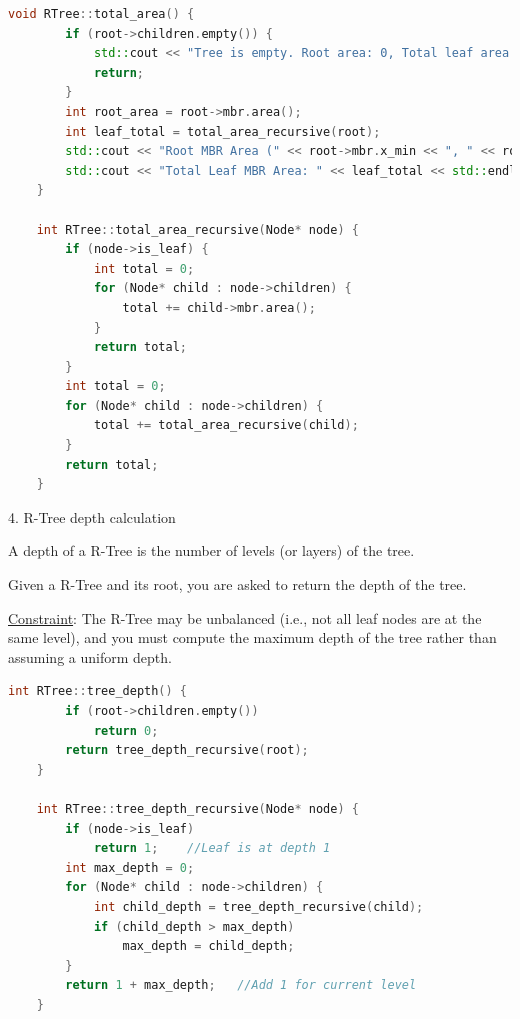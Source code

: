 \documentclass{article}
\begin{document}
\begin{lstlisting}[language=c++]
	void RTree::total_area() {
		if (root->children.empty()) {
			std::cout << "Tree is empty. Root area: 0, Total leaf area: 0" << std::endl;
			return;
		}
		int root_area = root->mbr.area();
		int leaf_total = total_area_recursive(root);
		std::cout << "Root MBR Area (" << root->mbr.x_min << ", " << root->mbr.y_min << ", " << root->mbr.x_max << ", " << root->mbr.y_max << "): " << root_area << std::endl;
		std::cout << "Total Leaf MBR Area: " << leaf_total << std::endl;
	}

	int RTree::total_area_recursive(Node* node) {
		if (node->is_leaf) {
			int total = 0;
			for (Node* child : node->children) {
				total += child->mbr.area();
			}
			return total;
		}
		int total = 0;
		for (Node* child : node->children) {
			total += total_area_recursive(child);
		}
		return total;
	}
\end{lstlisting}

\begin{question}{4. R-Tree depth calculation}
	
	\quad A depth of a R-Tree is the number of levels (or layers) of the tree.

	\quad Given a R-Tree and its root, you are asked to return the depth of the tree.

	\quad \underline{Constraint}: The R-Tree may be unbalanced (i.e., not all leaf nodes are at the same level), and you must compute the maximum depth of the tree rather than assuming a uniform depth.
\end{question}

\begin{lstlisting}[language=c++]
	int RTree::tree_depth() {
		if (root->children.empty()) 
			return 0;
		return tree_depth_recursive(root);
	}

	int RTree::tree_depth_recursive(Node* node) {
		if (node->is_leaf) 
			return 1;    //Leaf is at depth 1
		int max_depth = 0;
		for (Node* child : node->children) {
			int child_depth = tree_depth_recursive(child);
			if (child_depth > max_depth) 
				max_depth = child_depth;
		}
		return 1 + max_depth;   //Add 1 for current level
	}
\end{lstlisting}

\printbibliography
\end{document}
